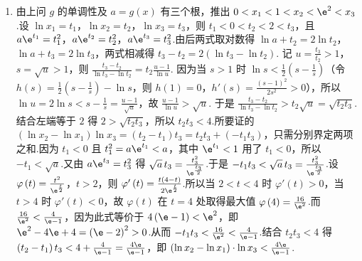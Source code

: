 \documentclass[UTF8,a4paper,oneside,11pt]{ctexbook}
\begin{document}
\begin{solution}
\begin{enumerate}
\begin{enumerate}
\item 由上问 \(g\) 的单调性及 \(a=g\left(x\right)\) 有三个根，推出 \(0<x_1<1<x_2<\e^2<x_3\).设 \(\ln x_1=t_1\)，\(\ln x_2=t_2\)，\(\ln x_3=t_3\)，则 \(t_1<0<t_2<2<t_3\)，且 \(a\e^{t_1}=t_1^2\)，\(a\e^{t_2}=t_2^2\)，\(a\e^{t_3}=t_3^2\).由后两式取对数得 \(\ln a+t_2=2\ln t_2\)，\(\ln a+t_3=2\ln t_3\)，两式相减得 \(t_3-t_2=2\left(\ln t_3-\ln t_2\right)\). 记 \(u=\frac{t_3}{t_2}>1\)，\(s=\sqrt{u}>1\)，则 \(\frac{t_3-t_2}{\ln t_3-\ln t_2}=t_2\frac{u-1}{\ln u}\). 因为当 \(s>1\) 时 \(\ln s<\frac12\left(s-\frac1s\right)\)（令 \(h\left(s\right)=\frac12\left(s-\frac1s\right)-\ln s\)，则 \(h\left(1\right)=0\)，\(h'\left(s\right)=\frac{\left(s-1\right)^2}{2s^2}>0\)），所以 \(\ln u=2\ln s<s-\frac1s=\frac{u-1}{\sqrt{u}}\)，故 \(\frac{u-1}{\ln u}>\sqrt{u}\). 于是 \(\frac{t_3-t_2}{\ln t_3-\ln t_2}>t_2\sqrt{u}=\sqrt{t_2t_3}\). 结合左端等于 \(2\) 得 \(2>\sqrt{t_2t_3}\)，所以 \(t_2t_3<4\).所要证的 \(\left(\ln x_2-\ln x_1\right)\ln x_3=\left(t_2-t_1\right)t_3=t_2t_3+\left(-t_1t_3\right)\)，只需分别界定两项之和.因为 \(t_1<0\) 且 \(t_1^2=a\e^{t_1}<a\)，其中 \(\e^{t_1}<1\) 用了 \(t_1<0\)，所以 \(-t_1<\sqrt{a}\).又由 \(a\e^{t_3}=t_3^2\) 得 \(\sqrt{a}\,t_3=\frac{t_3^2}{\e^{\frac{t_3}{2}}}\).于是 \(-t_1t_3<\sqrt{a}\,t_3=\frac{t_3^2}{\e^{\frac{t_3}{2}}}\).设 \(\varphi\left(t\right)=\frac{t^2}{\e^{\frac{t}{2}}}\)，\(t>2\)，则 \(\varphi'\left(t\right)=\frac{t\left(4-t\right)}{2\e^{\frac{t}{2}}}\).所以当 \(2<t<4\) 时 \(\varphi'\left(t\right)>0\)，当 \(t>4\) 时 \(\varphi'\left(t\right)<0\)，故 \(\varphi\left(t\right)\) 在 \(t=4\) 处取得最大值 \(\varphi\left(4\right)=\frac{16}{\e^2}\).而 \(\frac{16}{\e^2}<\frac{4}{\e-1}\)，因为此式等价于 \(4\left(\e-1\right)<\e^2\)，即 \(\e^2-4\e+4=\left(\e-2\right)^2>0\).从而 \(-t_1t_3<\frac{16}{\e^2}<\frac{4}{\e-1}\).结合 \(t_2t_3<4\) 得 \(\left(t_2-t_1\right)t_3<4+\frac{4}{\e-1}=\frac{4\e}{\e-1}\)，即 \(\left(\ln x_2-\ln x_1\right)\cdot\ln x_3<\frac{4\e}{\e-1}\).
\end{enumerate}
\end{enumerate}
\end{solution}

\end{document}

